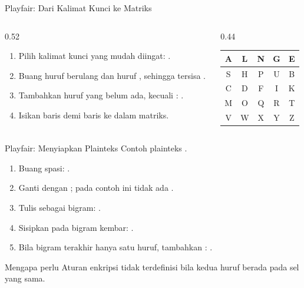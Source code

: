 \documentclass[aspectratio=169,11pt]{beamer}
\begin{document}
\begin{frame}{Playfair: Dari Kalimat Kunci ke Matriks}
    \begin{columns}[T,onlytextwidth]
        \begin{column}{0.52\textwidth}
            \footnotesize
            \begin{enumerate}
                \item Pilih kalimat kunci yang mudah diingat:
                      .
                \item Buang huruf berulang dan huruf , sehingga
                      tersisa .
                \item Tambahkan huruf yang belum ada, kecuali :
                      .
                \item Isikan baris demi baris ke dalam matriks.
            \end{enumerate}
        \end{column}
        \begin{column}{0.44\textwidth}
            \centering
            \footnotesize
            \begin{tabular}{|c|c|c|c|c|}
                \hline
                A & L & N & G & E \\ \hline
                S & H & P & U & B \\ \hline
                C & D & F & I & K \\ \hline
                M & O & Q & R & T \\ \hline
                V & W & X & Y & Z \\ \hline
            \end{tabular}
        \end{column}
    \end{columns}
\end{frame}

\begin{frame}{Playfair: Menyiapkan Plainteks}
    \footnotesize
    Contoh plainteks .
    \begin{enumerate}
        \item Buang spasi: .
        \item Ganti  dengan ; pada contoh ini tidak ada
              .
        \item Tulis sebagai bigram: .
        \item Sisipkan  pada bigram kembar:
              .
        \item Bila bigram terakhir hanya satu huruf, tambahkan :
              .
    \end{enumerate}
    \begin{alertblock}{Mengapa perlu}
        \footnotesize
        Aturan enkripsi tidak terdefinisi bila kedua huruf berada pada sel
        yang sama.
    \end{alertblock}
\end{frame}
\end{document}
